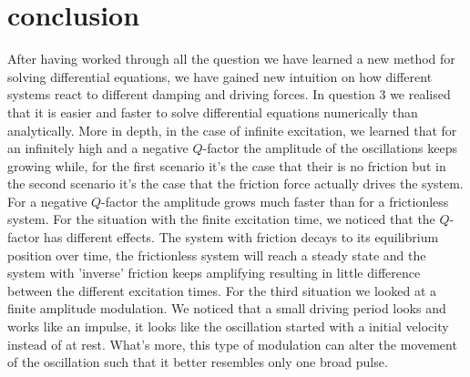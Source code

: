 \section{conclusion}
After having worked through all the question we have learned a new method for solving differential equations, we have gained new intuition on how different systems react to different damping and driving forces. In question 3 we realised that it is easier and faster to solve differential equations numerically than analytically.
More in depth, in the case of infinite excitation, we learned that for an infinitely high and a negative $Q$-factor the amplitude of the oscillations keeps growing while, for the first scenario it's the case that their is no friction but in the second scenario it's the case that the friction force actually drives the system. For a negative $Q$-factor the amplitude grows much faster than for a frictionless system.
For the situation with the finite excitation time, we noticed that the $Q$-factor has different effects. The system with friction decays to its equilibrium position over time, the frictionless system will reach a steady state and the system with 'inverse' friction keeps amplifying resulting in little difference between the different excitation times.
For the third situation we looked at a finite amplitude modulation. We noticed that a small driving period looks and works like an impulse, it looks like the oscillation started with a initial velocity instead of at rest. What's more, this type of modulation can alter the movement of the oscillation such that it better resembles only one broad pulse. 